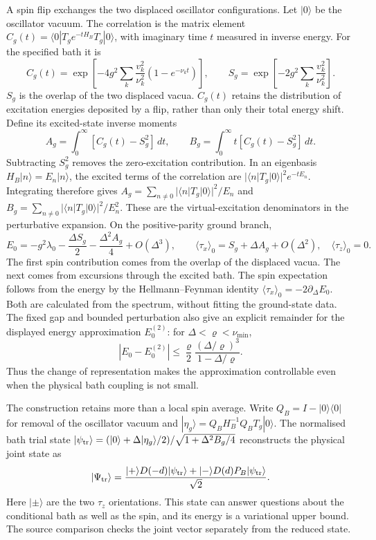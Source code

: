A spin flip exchanges the two displaced oscillator configurations. Let $|0\rangle$ be the oscillator vacuum. The correlation is the matrix element $C_g(t)=\langle0|T_g e^{-tH_B}T_g|0\rangle$, with imaginary time $t$ measured in inverse energy. For the specified bath it is
\begin{equation}
 C_g(t)=
 \exp\!\left[-4g^2\sum_k\frac{v_k^2}{\nu_k^2}
                 (1-e^{-\nu_k t})\right],
 \qquad
 S_g=\exp\!\left[-2g^2\sum_k\frac{v_k^2}{\nu_k^2}\right].
 \label{eq:hmf-retained-spectrum}
\end{equation}
$S_g$ is the overlap of the two displaced vacua. $C_g(t)$ retains the distribution of excitation energies deposited by a flip, rather than only their total energy shift. Define its excited-state inverse moments
\[
 A_g=\int_0^\infty[C_g(t)-S_g^2]\,dt,
 \qquad
 B_g=\int_0^\infty t[C_g(t)-S_g^2]\,dt.
\]
Subtracting $S_g^2$ removes the zero-excitation contribution. In an eigenbasis $H_B|n\rangle=E_n|n\rangle$, the excited terms of the correlation are $|\langle n|T_g|0\rangle|^2e^{-tE_n}$. Integrating therefore gives $A_g=\sum_{n\ne0}|\langle n|T_g|0\rangle|^2/E_n$ and $B_g=\sum_{n\ne0}|\langle n|T_g|0\rangle|^2/E_n^2$. These are the virtual-excitation denominators in the perturbative expansion. On the positive-parity ground branch,
\begin{equation}
 E_0=-g^2\lambda_0-\frac{\Delta S_g}{2}
                      -\frac{\Delta^2 A_g}{4}+O(\Delta^3),
 \qquad
 \langle\tau_x\rangle_0=S_g+\Delta A_g+O(\Delta^2),
 \quad \langle\tau_z\rangle_0=0.
 \label{eq:hmf-ground-prediction}
\end{equation}
The first spin contribution comes from the overlap of the displaced vacua. The next comes from excursions through the excited bath. The spin expectation follows from the energy by the Hellmann--Feynman identity $\langle\tau_x\rangle_0=-2\partial_\Delta E_0$. Both are calculated from the spectrum, without fitting the ground-state data. The fixed gap and bounded perturbation also give an explicit remainder for the displayed energy approximation $E_0^{(2)}$: for $\Delta<\varrho<\nu_{\min}$,
\[
 |E_0-E_0^{(2)}|
 \le \frac{\varrho}{2}
       \frac{(\Delta/\varrho)^3}{1-\Delta/\varrho}.
\]
Thus the change of representation makes the approximation controllable even when the physical bath coupling is not small.

The construction retains more than a local spin average. Write $Q_B=I-|0\rangle\langle0|$ for removal of the oscillator vacuum and
$|\eta_g\rangle=Q_BH_B^{-1}Q_BT_g|0\rangle$. The normalised bath trial state
$|\psi_{\rm tr}\rangle=(|0\rangle+\Delta|\eta_g\rangle/2)/\sqrt{1+\Delta^2B_g/4}$
reconstructs the physical joint state as
\begin{equation}
 |\Psi_{\rm tr}\rangle=
 \frac{|+\rangle D(-d)|\psi_{\rm tr}\rangle
       +|-\rangle D(d)P_B|\psi_{\rm tr}\rangle}{\sqrt2}.
 \label{eq:hmf-conditional-bath}
\end{equation}
Here $|\pm\rangle$ are the two $\tau_z$ orientations. This state can answer questions about the conditional bath as well as the spin, and its energy is a variational upper bound. The source comparison checks the joint vector separately from the reduced state.

